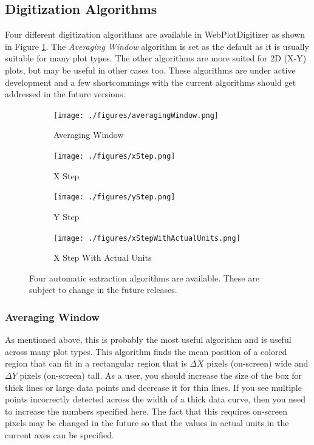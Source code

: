 \documentclass[letterpaper, 10pt]{article}
\begin{document}
\subsection{Digitization Algorithms}
Four different digitization algorithms are available in WebPlotDigitizer as shown in Figure \ref{fig:autoExtractAlgos}. The \emph{Averaging Window} algorithm is set as the default as it is usually suitable for many plot types. The other algorithms are more suited for 2D (X-Y) plots, but may be useful in other cases too. These algorithms are under active development and a few shortcommings with the current algorithms should get addressed in the future versions. 
\begin{figure}
\begin{subfigure}[b]{0.3\textwidth}
\texttt{[image: ./figures/averagingWindow.png]}
\caption{Averaging Window}
\end{subfigure}
\begin{subfigure}[b]{0.3\textwidth}
\texttt{[image: ./figures/xStep.png]}
\caption{X Step}
\end{subfigure}
\begin{subfigure}[b]{0.3\textwidth}
\texttt{[image: ./figures/yStep.png]}
\caption{Y Step}
\end{subfigure}
\centering
\begin{subfigure}[b]{0.3\textwidth}
\texttt{[image: ./figures/xStepWithActualUnits.png]}
\caption{X Step With Actual Units}
\end{subfigure}
\caption{Four automatic extraction algorithms are available. These are subject to change in the future releases.}
\label{fig:autoExtractAlgos}

\end{figure}
\subsubsection{Averaging Window}
As mentioned above, this is probably the most useful algorithm and is useful across many plot types. This algorithm finds the mean position of a colored region that can fit in a rectangular region that is $\Delta X$ pixels (on-screen) wide and $\Delta Y$ pixels (on-screen) tall. As a user, you should increase the size of the box for thick lines or large data points and decrease it for thin lines. If you see multiple points incorrectly detected across the width of a thick data curve, then you need to increase the numbers specified here. The fact that this requires on-screen pixels may be changed in the future so that the values in actual units in the current axes can be specified.
\end{document}
